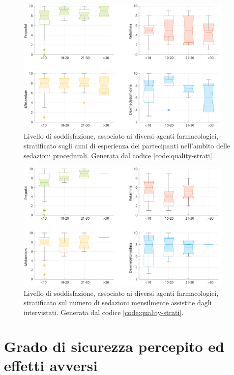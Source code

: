 \vfill
\begin{figure}[ht]
    \centering
    \includegraphics[width=0.95\textwidth]{Figure/qualita-strat-esperienza.pdf}
    \caption{Livello di soddisfazione, associato ai diversi agenti farmacologici, stratificato sugli anni di esperienza dei partecipanti nell'ambito delle sedazioni procedurali. Generata dal codice \ref{code:quality-strati}.}
    \label{fig:qualitaesperienza}
\end{figure}

\vfill
\begin{figure}[!h]
    \centering
    \includegraphics[width=0.95\textwidth]{Figure/qualita-strat-frequenza.pdf}
    \caption{Livello di soddisfazione, associato ai diversi agenti farmacologici, stratificato sul numero di sedazioni mensilmente assistite dagli intervistati. Generata dal codice \ref{code:quality-strati}.}
    \label{fig:qualitafrequenza}
\end{figure}

\vfill
\newpage

\vfill
\section{Grado di sicurezza percepito ed effetti avversi}

